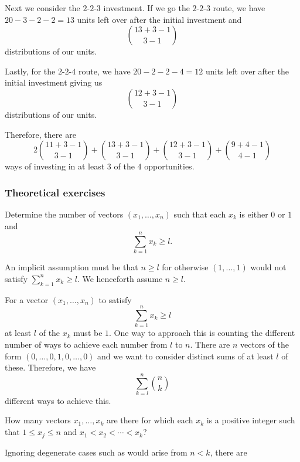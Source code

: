 \begin{solution*}
  Next we consider the \(2\)-\(2\)-\(3\) investment. If we go the
  \(2\)-\(2\)-\(3\) route, we have \(20-3-2-2=13\) units left over after
  the initial investment and
  \[
    \binom{13+3-1}{3-1}
  \]
  distributions of our units.

  Lastly, for the \(2\)-\(2\)-\(4\) route, we have \(20-2-2-4=12\) units
  left over after the initial investment giving us
  \[
    \binom{12+3-1}{3-1}
  \]
  distributions of our units.

  Therefore, there are
  \[
    2\binom{11+3-1}{3-1}
    +\binom{13+3-1}{3-1}
    +\binom{12+3-1}{3-1}
    +\binom{9+4-1}{4-1}
  \]
  ways of investing in at least \(3\) of the \(4\) opportunities.
\end{solution*}

\subsubsection{Theoretical exercises}
\begin{problem}[Ross, \S 1, \# 5]
  Determine the number of vectors \((x_1,\dotsc,x_n)\) such that each
  \(x_k\) is either \(0\) or \(1\) and
  \[
    \sum_{k=1}^n x_k\geq l.
  \]
\end{problem}
\begin{solution*}
  An implicit assumption must be that \(n\geq l\) for otherwise
  \((1,\dotsc,1)\) would not satisfy \(\sum_{k=1}^n x_k\geq l\). We
  henceforth assume \(n\geq l\).

  For a vector \((x_1,\dotsc,x_n)\) to satisfy
  \[
    \sum_{k=1}^n x_k\geq l
  \]
  at least \(l\) of the \(x_k\) must be \(1\). One way to approach this is
  counting the different number of ways to achieve each number from \(l\)
  to \(n\). There are \(n\) vectors of the form
  \((0,\dotsc,0,1,0,\dotsc,0)\) and we want to consider distinct sums of at
  least \(l\) of these. Therefore, we have
  \[
    \sum_{k=l}^n\binom{n}{k}
  \]
  different ways to achieve this.
\end{solution*}

\begin{problem}[Ross, \S 1, \# 6]
  How many vectors \(x_1,\dotsc,x_k\) are there for which each \(x_k\) is a
  positive integer such that \(1\leq x_j\leq n\) and
  \(x_1<x_2<\dotsb<x_k\)?
\end{problem}
\begin{solution*}
  Ignoring degenerate cases such as would arise from \(n<k\), there are
\end{solution*}

